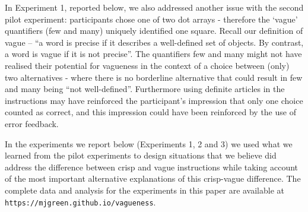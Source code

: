 In Experiment 1, reported below, we also addressed another issue with the second pilot experiment: participants chose one of two dot arrays - therefore the `vague' quantifiers (few and many) uniquely identified one square. Recall our definition of vague  -- ``a word is precise if it describes a well-defined set of objects. By contrast, a word is vague if it is not precise''. The quantifiers few and many might not have realised their potential for vagueness in the context of a choice between (only) two alternatives - where there is no borderline alternative that could result in few and many being ``not well-defined''. Furthermore using definite articles in the instructions may have reinforced the participant's impression that only one choice counted as correct, and this impression could have been reinforced by the use of error feedback.

In the experiments we report below (Experiments 1, 2 and 3) we used what we learned from the pilot experiments to design situations that we believe did address the difference between crisp and vague instructions while taking account of the most important alternative explanations of this crisp-vague difference. The complete data and analysis for the experiments in this paper are available at \texttt{https://mjgreen.github.io/vagueness}.



